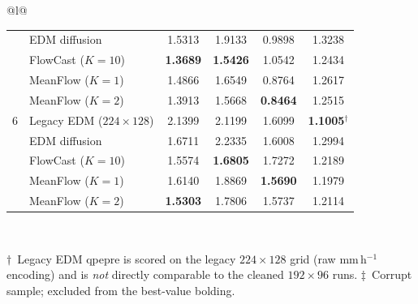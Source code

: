 \documentclass[border=10pt]{standalone}
\begin{document}
\begin{tabular}{@{}l@{}}
\begin{tabular}{llcccc}
 & EDM diffusion & 1.5313 & 1.9133 & 0.9898 & 1.3238 \\
 & FlowCast ($K{=}10$) & \textbf{1.3689} & \textbf{1.5426} & 1.0542 & 1.2434 \\
 & MeanFlow ($K{=}1$) & 1.4866 & 1.6549 & 0.8764 & 1.2617 \\
 & MeanFlow ($K{=}2$) & 1.3913 & 1.5668 & \textbf{0.8464} & 1.2515 \\
\midrule
6 & Legacy EDM ($224{\times}128$) & 2.1399 & 2.1199 & 1.6099 & \textbf{1.1005}$^\dagger$ \\
 & EDM diffusion & 1.6711 & 2.2335 & 1.6008 & 1.2994 \\
 & FlowCast ($K{=}10$) & 1.5574 & \textbf{1.6805} & 1.7272 & 1.2189 \\
 & MeanFlow ($K{=}1$) & 1.6140 & 1.8869 & \textbf{1.5690} & 1.1979 \\
 & MeanFlow ($K{=}2$) & \textbf{1.5303} & 1.7806 & 1.5737 & 1.2114 \\
\bottomrule
\end{tabular} \\[6pt]
\begin{minipage}{11cm}\footnotesize $\dagger$~Legacy EDM qpepre is scored on the legacy $224{\times}128$ grid (raw mm\,h$^{-1}$ encoding) and is \emph{not} directly comparable to the cleaned $192{\times}96$ runs. $\ddagger$~Corrupt sample; excluded from the best-value bolding.\end{minipage} \\
\end{tabular}
\end{document}
